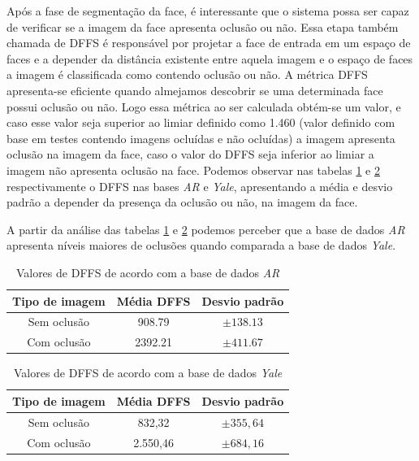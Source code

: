 Após a fase de segmentação da face, é interessante que  o sistema possa ser capaz de verificar se a imagem da face apresenta oclusão ou não. Essa etapa também chamada de DFFS  é responsável por projetar a face de entrada em um espaço de faces e a depender da distância existente entre aquela imagem e o espaço de faces a imagem é classificada como contendo oclusão ou não. A métrica DFFS apresenta-se eficiente quando almejamos descobrir se uma determinada face possui oclusão ou não. Logo essa métrica ao ser calculada obtém-se um valor, e caso esse valor seja superior ao limiar definido como 1.460 (valor definido com base em testes contendo imagens ocluídas e não ocluídas) a imagem apresenta oclusão na imagem da face, caso o valor do DFFS seja inferior ao limiar a imagem não apresenta oclusão na face. Podemos observar nas tabelas \ref{tab:valoresDFFS_AR} e \ref{tab:valoresDFFS_Yale} respectivamente o DFFS nas bases \textit{AR} e \textit{Yale}, apresentando a média e desvio padrão a depender da presença da oclusão ou não, na imagem da face. 


A partir da análise das tabelas \ref{tab:valoresDFFS_AR} e \ref{tab:valoresDFFS_Yale} podemos perceber que a base de dados \textit{AR} apresenta níveis maiores de oclusões quando comparada a base de dados \textit{Yale}. 


\begin{table}[H]
  \centering
  \caption{Valores de DFFS de acordo com a base de dados \textit{AR}}
    \begin{tabular}{c|c|c}
    Tipo de imagem & \multicolumn{1}{l|}{Média DFFS} & \multicolumn{1}{l}{Desvio padrão} \\
    \midrule
    Sem oclusão & 908.79   & $\pm 138.13 $ \\
    \midrule
    Com oclusão & 2392.21 & $\pm 411.67 $ \\
    \bottomrule
    \end{tabular}%
  \label{tab:valoresDFFS_AR}%
\end{table}%




\begin{table}[H]
  \centering
  \caption{Valores de DFFS de acordo com a base de dados \textit{Yale}}
    \begin{tabular}{c|c|c}
    Tipo de imagem & \multicolumn{1}{l|}{Média DFFS} & \multicolumn{1}{l}{Desvio padrão} \\
    \midrule
    Sem oclusão & 832,32   & $\pm 355,64$ \\
    \midrule
    Com oclusão & 2.550,46 & $ \pm 684,16$ \\
    \bottomrule
    \end{tabular}%
  \label{tab:valoresDFFS_Yale}%
\end{table}%



